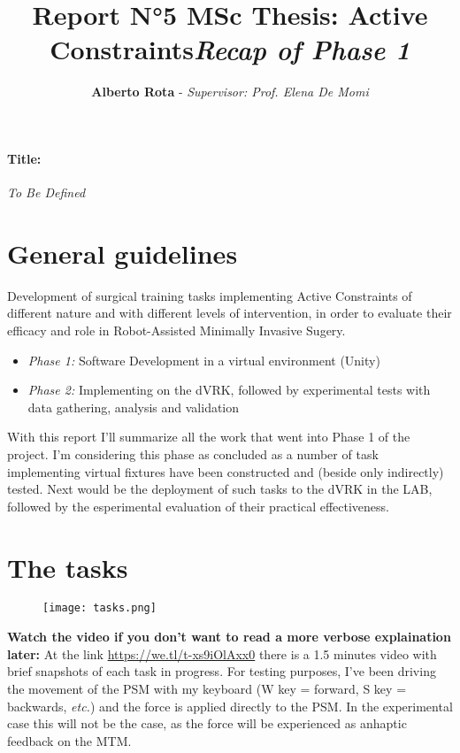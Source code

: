 \documentclass{article}
\title{\textbf{Report N°5 MSc Thesis: Active Constraints}\newline \large{\textit{Recap of Phase 1}}}
\author{\textbf{Alberto Rota} - \textit{Supervisor: Prof. Elena De Momi}}
\date{}
\begin{document}
\maketitle
\paragraph{Title:} \textit{To Be Defined}
\section*{General guidelines}
    Development of surgical training tasks implementing Active Constraints of
    different nature and with different levels of intervention, in order to
    evaluate their efficacy and role in Robot-Assisted Minimally Invasive Sugery.
    \begin{itemize}
        \item \textit{Phase 1: }Software Development in a virtual environment (Unity)
        \item \textit{Phase 2: }Implementing on the dVRK, followed by
        experimental tests with data gathering, analysis and validation
    \end{itemize}

\noindent With this report I'll summarize all the work that went into Phase 1 of the project. I'm considering this phase as concluded as a number of task implementing virtual fixtures have been constructed and (beside only indirectly) tested. Next would be the deployment of such tasks to the dVRK in the LAB, followed by the esperimental evaluation of their practical effectiveness.

\section*{The tasks}
\begin{figure}[h!]
    \centering
    \texttt{[image: tasks.png]}
\end{figure}

\noindent \textbf{Watch the video if you don't want to read a more verbose explaination later: }\newline At the link \href{https://we.tl/t-xs9iOlAxx0}{https://we.tl/t-xs9iOlAxx0} there is a 1.5 minutes video with brief snapshots of each task in progress. For testing purposes, I've been driving the movement of the PSM with my keyboard (W key = forward, S key = backwards, \textit{etc.}) and the force is applied directly to the PSM. In the experimental case this will not be the case, as the force will be experienced as anhaptic feedback on the MTM.
\end{document}
